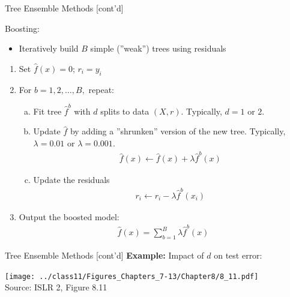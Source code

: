 \documentclass[ignorenonframetext,xcolor=x11names]{beamer}
\begin{document}
\begin{frame}{Tree Ensemble Methods \small [cont'd]}
\begin{block}{Boosting:}
\begin{itemize}
    \item Iteratively build $B$ simple (''weak'') trees using residuals
\end{itemize}
\end{block}

\footnotesize
\begin{enumerate}
\item Set $\hat{f}(x) = 0$; $r_i=y_i$
\item For $b = 1, 2, \ldots, B,$ repeat:
\begin{enumerate}[(a)]
\footnotesize
  \item Fit tree $\hat{f}^b$ with $d$ splits to data $(X, r)$. Typically, $d=1$ or $2$.
  \item Update $\hat{f}$ by adding a ''shrunken'' version of the new tree. Typically, $\lambda = 0.01$ or $\lambda = 0.001$.
   \begin{align*}
   \hat{f}(x) \leftarrow \hat{f}(x) + \lambda \hat{f}^b (x)
   \end{align*}
  \item Update the residuals
   \begin{align*}r_i \leftarrow r_i - \lambda \hat{f}^b(x_i)
   \end{align*}
\end{enumerate}
\item Output the boosted model:
\begin{align*}\hat{f}(x) = \sum_{b=1}^B \lambda \hat{f}^b (x)\end{align*}
\end{enumerate}
\end{frame}

\begin{frame}{Tree Ensemble Methods \small [cont'd]}
\textbf{Example:} Impact of $d$ on test error:

\centering

\texttt{[image: ../class11/Figures\_Chapters\_7-13/Chapter8/8\_11.pdf]} \\

\scriptsize Source: ISLR 2, Figure 8.11 \normalsize
\end{frame}
\end{document}
